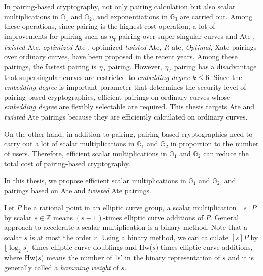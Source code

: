 In pairing-based cryptography, not only pairing calculation but also scalar multiplications in $\mathbb{G}_1$ and $\mathbb{G}_2$, and exponentiations in $\mathbb{G}_3$ are carried out.
Among these operations, since pairing is the highest cost operation, a lot of improvements for pairing such as $\eta_T$ pairing over super singular curves and Ate \cite{Hess}, {\it twisted} Ate\cite{Hess}, {\it optimized} Ate \cite{TAte}, optimized {\it twisted} Ate\cite{TAte}, $R$-ate\cite{Rate}, {\it Optimal}\cite{OptAte}, Xate \cite{Xate} pairings over ordinary curves, have been proposed in the recent years.
Among these pairings, the fastest pairing is $\eta_T$ pairing.
However, $\eta_T$ pairing has a disadvantage that supersingular curves are restricted to {\it embedding degree} $k\leq6$. 
Since the {\it embedding degree} is important parameter that determines the security level of pairing-based cryptographies, efficient pairings on ordinary curves whose {\it embedding degree} are flexibly selectable are required.
This thesis targets Ate and {\it twisted} Ate pairings because they are efficiently calculated on ordinary curves.
  
On the other hand, in addition to pairing, pairing-based cryptographies need to carry out a lot of scalar multiplications in $\mathbb{G}_1$ and $\mathbb{G}_2$ in proportion to the number of users.
Therefore, efficient scalar multiplications in $\mathbb{G}_1$ and $\mathbb{G}_2$ can reduce the total cost of pairing-based cryptography.

In this thesis, we propose efficient scalar multiplications in $\mathbb{G}_1$ and $\mathbb{G}_2$, and pairings based on Ate and {\it twisted} Ate pairings.

Let $P$ be a rational point in an elliptic curve group, a scalar multiplication $[s]P$ by scalar $s\in{\mathbb Z}$ means $(s-1)$-times elliptic curve additions of $P$.
General approach to accelerate a scalar multiplication is a binary method.
Note that a scalar $s$ is at most the order $r$.
Using a binary method, we can calculate $[s]P$ by $\lfloor \log_2 s \rfloor$-times elliptic curve doublings and Hw($s$)-times elliptic curve additions, where Hw($s$) means the number of 1s' in the binary representation of $s$ and it is generally called a {\it hamming weight} of $s$.  

